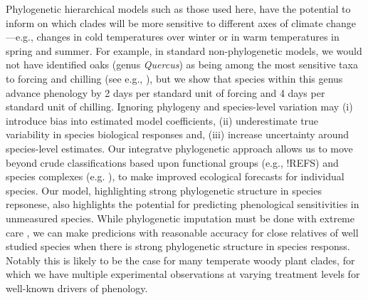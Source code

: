 \documentclass{article}\usepackage[]{graphicx}\usepackage[]{color}
\begin{document}

Phylogenetic hierarchical models such as those used here, have the potential to inform on which clades will be more sensitive to different axes of climate change---e.g., changes in cold temperatures over winter or in warm temperatures in spring and summer. For example, in standard non-phylogenetic models, we would not have identified oaks (genus \emph{Quercus}) as being among the most sensitive taxa to forcing and chilling (see e.g., \citep{ettinger2020}), but we show that species within this genus advance phenology by 2 days per standard unit of forcing and 4 days per standard unit of chilling. Ignoring phylogeny and species-level variation may (i) introduce bias into estimated model coefficients, (ii) underestimate true variability in species biological responses and, (iii) increase uncertainty around species-level estimates. Our integratve phylogenetic approach allows us to move beyond crude classifications based upon functional groups (e.g., !REFS) and species complexes (e.g. \cite{ettinger2020}), to make improved ecological forecasts for individual species. Our model, highlighting strong phylogenetic structure in species repsonese, also highlights the potential for predicting phenological sensitivities in unmeasured species. While phylogenetic imputation must be done with extreme care \citep{molina2018assessing}, we can make predicions with reasonable accuracy for close relatives of well studied species when there is strong phylogenetic structure in species responss. Notably this is likely to be the case for many temperate woody plant clades, for which we have multiple experimental observations at varying treatment levels for well-known drivers of phenology.\\  
\end{document}
